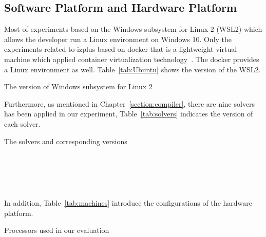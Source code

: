 \subsection{Software Platform and Hardware Platform}
\label{sec:softplat}
Most of experiments based on the Windows subsystem for Linux 2 (WSL2) which allows the developer run a Linux environment on Windows 10. Only the experiments related to izplus based on docker that is a lightweight virtual machine which applied container virtualization technology~\cite{r25}. The docker provides a Linux environment as well. Table~\ref{tab:Ubuntu} shows the version of the WSL2.
\begin{table}[htbp]
  \centering

  \caption{The version of Windows subsystem for Linux 2}
  
  \label{tab:Ubuntu}
  
\end{table}
Furthermore, as mentioned in Chapter~\ref{section:compiler}, there are nine solvers has been applied in our experiment, Table~\ref{tab:solvers} indicates the version of each solver.
\begin{table}[htbp]
  \centering

  \caption{The solvers and corresponding versions}
  
  \label{tab:solvers}
  	\begin{subtable}[b]{\textwidth}
  	\centering
  
    \end{subtable}\\
    	\begin{subtable}[b]{\textwidth}
  	\centering
  
  \end{subtable}\\
  \begin{subtable}[b]{\textwidth}
  \centering
  
  \end{subtable}
\end{table}
\\In addition, Table~\ref{tab:machines} introduce the configurations of the hardware platform.
\begin{table}[htbp]
  \centering

  \caption{Processors used in our evaluation}
  
  \label{tab:machines}
  
\end{table}
